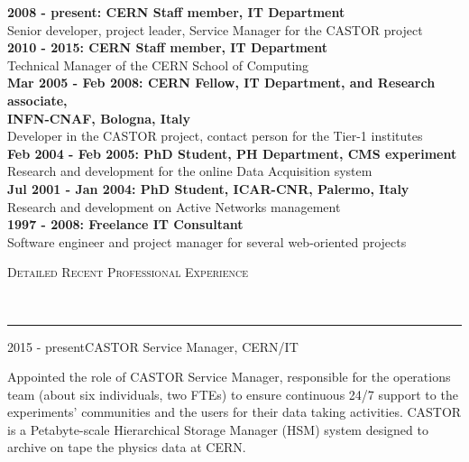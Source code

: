\documentclass[11pt]{article}
\renewcommand{\section}[2]%
        {\vspace{1.3\baselineskip}%
         \hspace{0in}%
         {\raggedright \scshape #1}\\[-0.15\baselineskip]%
                 \rule{\columnwidth}{1pt}%
        \vspace{.5\baselineskip}%
         \hspace{0in}
}
\renewcommand{\subsection}[2]%
        {
         {\bf{\raggedright \scshape #1}}{\bf{\hfill \scshape #2}}\\[-.7\baselineskip]
}
\begin{document}
\textbf{2008 - present: CERN Staff member, IT Department}\\
Senior developer, project leader, Service Manager for the CASTOR project\\[.3\baselineskip]
\textbf{2010 - 2015: CERN Staff member, IT Department}\\
Technical Manager of the CERN School of Computing\\[.3\baselineskip]
\textbf{Mar 2005 - Feb 2008: CERN Fellow, IT Department, and Research associate,\\ INFN-CNAF, Bologna, Italy}\\
Developer in the CASTOR project, contact person for the Tier-1 institutes\\[.3\baselineskip]
\textbf{Feb 2004 - Feb 2005: PhD Student, PH Department, CMS experiment}\\
Research and development for the online Data Acquisition system\\[.3\baselineskip]
\textbf{Jul 2001 - Jan 2004: PhD Student, ICAR-CNR, Palermo, Italy}\\
Research and development on Active Networks management\\[.3\baselineskip]
\textbf{1997 - 2008: Freelance IT Consultant}\\
Software engineer and project manager for several web-oriented projects


\section{Detailed Recent Professional Experience}

\subsection{2015 - present}{CASTOR Service Manager, CERN/IT}

Appointed the role of CASTOR Service Manager, responsible for the operations team (about six individuals, two FTEs) to ensure continuous 24/7 support to the experiments' communities and the users for their data taking activities.
CASTOR is a Petabyte-scale Hierarchical Storage Manager (HSM) system designed to archive on tape the physics data at CERN.
\end{document}
